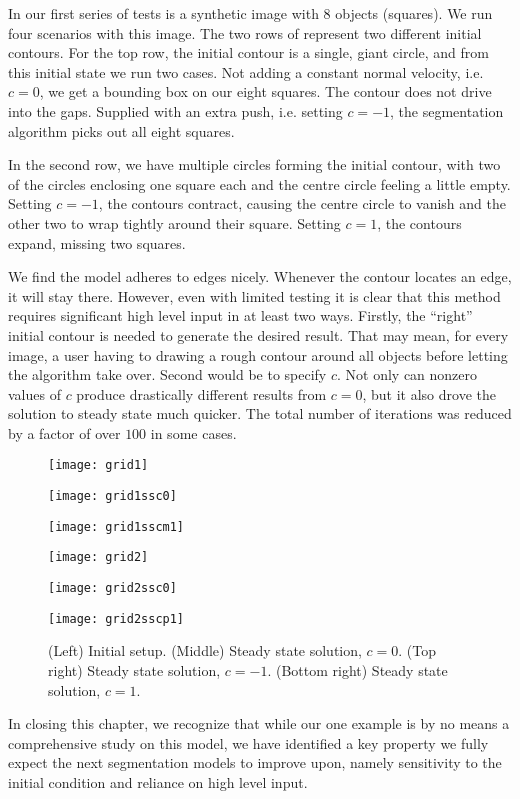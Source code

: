 \begin{eg}
	In our first series of tests is a synthetic image with 8 objects (squares). We run four scenarios with this image. The two rows of  represent two different initial contours. For the top row, the initial contour is a single, giant circle, and from this initial state we run two cases.  Not adding a constant normal velocity, i.e. $c = 0$, we get a bounding box on our eight squares. The contour does not drive into the gaps. Supplied with an extra push, i.e. setting $c = -1$, the segmentation algorithm picks out all eight squares.
	
	In the second row, we have multiple circles forming the initial contour, with two of the circles enclosing one square each and the centre circle feeling a little empty. Setting $c = -1$, the contours contract, causing the centre circle to vanish and the other two to wrap tightly around their square. Setting $c = 1$, the contours expand, missing two squares.
	
	We find the model adheres to edges nicely. Whenever the contour locates an edge, it will stay there. However, even with limited testing it is clear that this method requires significant high level input in at least two ways. Firstly, the ``right'' initial contour is needed to generate the desired result. That may mean, for every image, a user having to drawing a rough contour around all objects before letting the algorithm take over. Second would be to specify $c$. Not only can nonzero values of $c$ produce drastically different results from $c = 0$, but it also drove the solution to steady state much quicker. The total number of iterations was reduced by a factor of over $100$ in some cases.
	
	\begin{figure}[htb!]
		\centering
		\begin{minipage}{0.31\textwidth}
					\texttt{[image: grid1]}
		\end{minipage}%
		\begin{minipage}{0.31\textwidth}
			\texttt{[image: grid1ssc0]}
		\end{minipage}%
		\begin{minipage}{0.31\textwidth}
			\texttt{[image: grid1sscm1]}
		\end{minipage}
		\begin{minipage}{0.31\textwidth}
			\texttt{[image: grid2]}
		\end{minipage}%
		\begin{minipage}{0.31\textwidth}
			\texttt{[image: grid2ssc0]}
		\end{minipage}%
		\begin{minipage}{0.31\textwidth}
			\texttt{[image: grid2sscp1]}
		\end{minipage}
		
		\caption{(Left) Initial setup. (Middle) Steady state solution, $c = 0$. (Top right) Steady state solution, $c = -1$. (Bottom right) Steady state solution, $c = 1$.}\label{fig:grid}
	\end{figure}
\end{eg}

In closing this chapter, we recognize that while our one example is by no means a comprehensive study on this model, we have identified a key property we fully expect the next segmentation models to improve upon, namely sensitivity to the initial condition and reliance on high level input.
	

